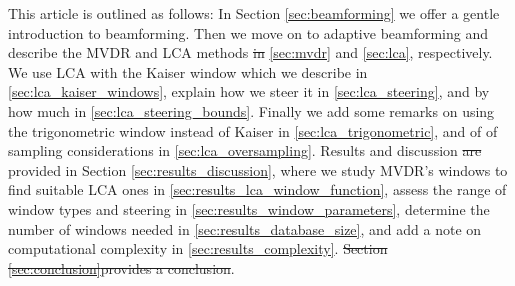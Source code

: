 \documentclass[10pt,journal,draftclsnofoot,onecolumn]{IEEEtran}
\newcommand\1{\vec 1}
\providecommand{\DIFadd}[1]{{\protect\color{blue}\uwave{#1}}} %
\providecommand{\DIFdel}[1]{{\protect\color{red}\sout{#1}}}                      %
\providecommand{\DIFaddbegin}{} %
\providecommand{\DIFaddend}{} %
\providecommand{\DIFdelbegin}{} %
\providecommand{\DIFdelend}{} %
\begin{document}
This article is outlined as follows: In Section \ref{sec:beamforming} we offer a gentle introduction to beamforming. Then we move on to adaptive beamforming and describe the MVDR and LCA methods \DIFdelbegin \DIFdel{in }\DIFdelend \ref{sec:mvdr} and \ref{sec:lca}, respectively. We use LCA with the Kaiser window which we describe in \ref{sec:lca_kaiser_windows}, explain how we steer it in \ref{sec:lca_steering}, and by how much in \ref{sec:lca_steering_bounds}. Finally we add some remarks on using the trigonometric window instead of Kaiser in \ref{sec:lca_trigonometric}, and of of sampling considerations in \ref{sec:lca_oversampling}. Results and discussion \DIFdelbegin \DIFdel{are }\DIFdelend \DIFaddbegin \DIFadd{a }\DIFaddend provided in Section \ref{sec:results_discussion}, where we study MVDR's windows to find suitable LCA ones in \ref{sec:results_lca_window_function}, assess the range of window types and steering in \ref{sec:results_window_parameters}, determine the number of windows needed in \ref{sec:results_database_size}, and add a note on computational complexity in \ref{sec:results_complexity}. \DIFdelbegin \DIFdel{Section \ref{sec:conclusion}provides a conclusion}\DIFdelend \DIFaddbegin \DIFadd{Finally we conclude in \ref{sec:conclusion}}\DIFaddend .


% 
% 
% 
% 
% 
% 
\end{document}
